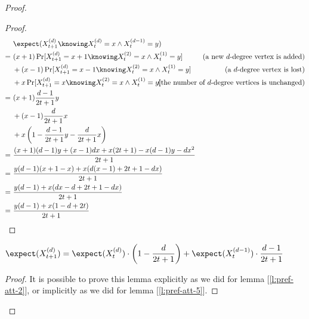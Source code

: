 \begin{proof}
    \begin{proof}
        \begin{align*}
            &\ \expect(X_{t + 1}^{(d)} \knowing X_t^{(d)} = x \wedge X_t^{(d - 1)} = y)             & \\
            =&\  (x + 1) \Pr[X_{t + 1}^{(d)} = x + 1 \knowing X_t^{(2)} = x \wedge X_t^{(1)} = y]   & \text{(a new $d$-degree vertex is added)}     \\
             &\; + (x - 1) \Pr[X_{t + 1}^{(d)} = x - 1 \knowing X_t^{(2)} = x \wedge X_t^{(1)} = y] & \text{(a $d$-degree vertex is lost)}          \\
             &\; + x \Pr[X_{t + 1}^{(d)} = x \knowing X_t^{(2)} = x \wedge X_t^{(1)} = y]           & \mathllap{\text{(the number of $d$-degree vertices is unchanged)}}   \\
            =&\ (x + 1) \frac{d - 1}{2t + 1} y                                                      & \\
             &\; + (x - 1) \frac{d}{2t + 1} x                                                       & \\
             &\; + x \left( 1 - \frac{d - 1}{2t + 1} y - \frac{d}{2t + 1} x \right)                 & \\
            =&\ \frac{(x + 1)(d - 1)y + (x - 1)dx + x(2t + 1) - x(d - 1)y - dx^2}{2t + 1}           & \\
            =&\ \frac{y(d - 1)(x + 1 - x) + x(d(x - 1) + 2t + 1 - dx)}{2t + 1}                      & \\
            =&\ \frac{y(d - 1) + x(dx  - d + 2t + 1 - dx)}{2t + 1}                                  & \\
            =&\ \frac{y(d - 1) + x(1 - d + 2t)}{2t + 1}                                             & \qedhere \\
        \end{align*}
    \end{proof}

    \begin{lem}\label{l:pref-att-8}
        $\displaystyle \expect(X_{t + 1}^{(d)}) = \expect(X_t^{(d)}) \cdot \left( 1 - \frac{d}{2t + 1} \right) + \expect(X_t^{(d - 1)}) \cdot \frac{d - 1}{2t + 1}$
    \end{lem}
    \begin{proof}
        It is possible to prove this lemma explicitly as we did for lemma [\ref{l:pref-att-2}], or implicitly as we did for lemma [\ref{l:pref-att-5}].
    \end{proof}


\end{proof}
